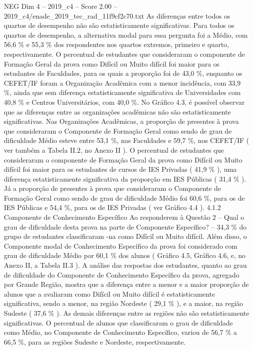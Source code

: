 \begin{textsample}{NEG Dim 4 – 2019\_c4 – Score 2.00 – 2019\_c4/enade\_2019\_tec\_rad\_11f9cf2c70.txt}
As diferenças entre todos os quartos de desempenho não são estatisticamente significativas.
Para todos os quartos de desempenho, a alternativa modal para essa pergunta foi a Médio, com 56,6 \% e 55,3 \% dos respondentes nos quartos extremos, primeiro e quarto, respectivamente.
O percentual de estudantes que consideraram o componente de Formação Geral da prova como Difícil ou Muito difícil foi maior para os estudantes de Faculdades, para os quais a proporção foi de 43,0 \%, enquanto os CEFET/IF foram a Organização Acadêmica com a menor incidência, com 33,9 \%, ainda que sem diferença estatisticamente significativa de Universidades com 40,8 \% e Centros Universitários, com 40,0 \%.
No Gráfico 4.3, é possível observar que as diferenças entre as organizações acadêmicas não são estatisticamente significativas.
Nas Organizações Acadêmicas, a proporção de presentes à prova que consideraram o Componente de Formação Geral como sendo de grau de dificuldade Médio esteve entre 53,1 \%, nas Faculdades e 59,7 \%, nos CEFET/IF ( ver também a Tabela II.2, no Anexo II ).
O percentual de estudantes que consideraram o componente de Formação Geral da prova como Difícil ou Muito difícil foi maior para os estudantes de cursos de IES Privadas ( 41,9 \% ), uma diferença estatisticamente significativa da proporção em IES Públicas ( 31,4 \% ).
Já a proporção de presentes à prova que consideraram o Componente de Formação Geral como sendo de grau de dificuldade Médio foi 60,6 \%, para os de IES Públicas e 54,4 \%, para os de IES Privadas ( ver Gráfico 4.4 ). 4.1.2 Componente de Conhecimento Específico Ao responderem à Questão 2 – Qual o grau de dificuldade desta prova na parte de Componente Específico? – 34,3 \% do grupo de estudantes classificaram -na como Difícil ou Muito difícil.
Além disso, o Componente modal de Conhecimento Específico da prova foi considerado com grau de dificuldade Médio por 60,1 \% dos alunos ( Gráfico 4.5, Gráfico 4.6, e, no Anexo II, a Tabela II.3 ).
A análise das respostas dos estudantes, quanto ao grau de dificuldade do Componente de Conhecimento Específico da prova, agregado por Grande Região, mostra que a diferença entre a menor e a maior proporção de alunos que a avaliaram como Difícil ou Muito difícil é estatisticamente significativa, sendo a menor, na região Nordeste ( 29,1 \% ), e a maior, na região Sudeste ( 37,6 \% ).
As demais diferenças entre as regiões não são estatisticamente significativas.
O percentual de alunos que classificaram o grau de dificuldade como Médio, no Componente de Conhecimento Específico, variou de 56,7 \% a 66,5 \%, para as regiões Sudeste e Nordeste, respectivamente.

\end{textsample}
